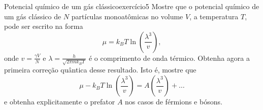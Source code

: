 \begin{exercício}{Potencial químico de um gás clássico}{exercício5}
    Mostre que o potencial químico de um gás clássico de \(N\) partículas monoatômicas no volume \(V\), a temperatura \(T\), pode ser escrito na forma
    \begin{equation*}
        \mu = k_B T \ln\left(\frac{\lambda^3}{v}\right),
    \end{equation*}
    onde \(v = \frac{\gamma V}{N}\) e \(\lambda = \frac{h}{\sqrt{2 \pi mk_B T}}\) é o comprimento de onda térmico. Obtenha agora a primeira correção quântica desse resultado. Isto é, mostre que
    \begin{equation*}
        \mu - k_BT \ln\left(\frac{\lambda^3}{v}\right) = A\left(\frac{\lambda^3}{v}\right) + \dots
    \end{equation*}
    e obtenha explicitamente o prefator \(A\) nos casos de férmions e bósons.
\end{exercício}

